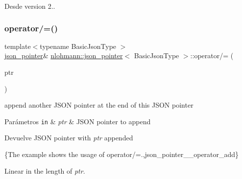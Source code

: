 \begin{DoxySince}{Desde}
version 2.. 
\end{DoxySince}
\mbox{\label{classnlohmann_1_1json__pointer_a7395bd0af29ac23fd3f21543c935cdfa}} 
\subsubsection{\texorpdfstring{operator/=()}{operator/=()}\hspace{0.1cm}{\footnotesize\ttfamily [1/3]}}
{\footnotesize\ttfamily template$<$typename Basic\+Json\+Type $>$ \\
\mbox{\hyperlink{classnlohmann_1_1json__pointer}{json\+\_\+pointer}}\& \mbox{\hyperlink{classnlohmann_1_1json__pointer}{nlohmann\+::json\+\_\+pointer}}$<$ Basic\+Json\+Type $>$\+::operator/= (\begin{DoxyParamCaption}\item[{const \mbox{\hyperlink{classnlohmann_1_1json__pointer}{json\+\_\+pointer}}$<$ Basic\+Json\+Type $>$ \&}]{ptr }\end{DoxyParamCaption})\hspace{0.3cm}{\ttfamily [inline]}}



append another J\+S\+ON pointer at the end of this J\+S\+ON pointer 


\begin{DoxyParams}[1]{Parámetros}
\mbox{\tt in}  & {\em ptr} & J\+S\+ON pointer to append \\
\hline
\end{DoxyParams}
\begin{DoxyReturn}{Devuelve}
J\+S\+ON pointer with {\itshape ptr} appended
\end{DoxyReturn}
\{The example shows the usage of {\ttfamily operator/=}.,json\+\_\+pointer\+\_\+\+\_\+operator\+\_\+add\}

Linear in the length of {\itshape ptr}.

